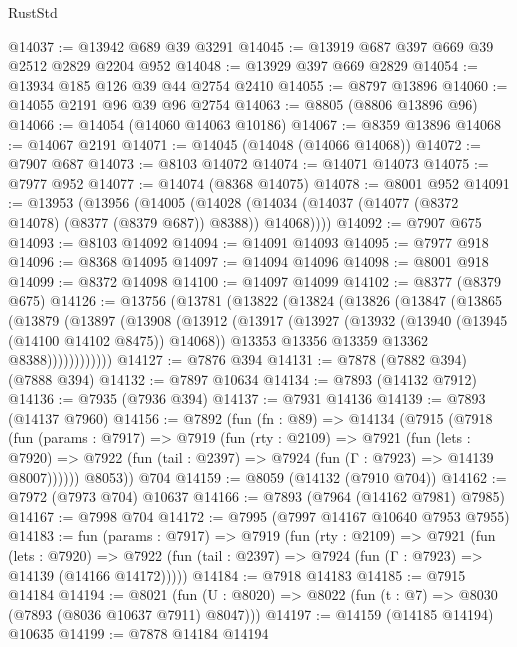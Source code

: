 \begin{lexlean}{RustStd}
\begin{coremodule}
{\begin{coremodule}
{{{{{{{{{{{{{{{{{{{{{{{{{{{{{{{{{{{{{{{{{{{{{{{{{{@14037 := @13942 @689 @39 @3291
@14045 := @13919 @687 @397 @669 @39 @2512 @2829 @2204 @952
@14048 := @13929 @397 @669 @2829
@14054 := @13934 @185 @126 @39 @44 @2754 @2410
@14055 := @8797 @13896
@14060 := @14055 @2191 @96 @39 @96 @2754
@14063 := @8805 (@8806 @13896 @96)
@14066 := @14054 (@14060 @14063 @10186)
@14067 := @8359 @13896
@14068 := @14067 @2191
@14071 := @14045 (@14048 (@14066 @14068))
@14072 := @7907 @687
@14073 := @8103 @14072
@14074 := @14071 @14073
@14075 := @7977 @952
@14077 := @14074 (@8368 @14075)
@14078 := @8001 @952
@14091 := @13953
    (@13956
      (@14005 (@14028 (@14034 (@14037 (@14077 (@8372 @14078) (@8377 (@8379 @687)) @8388)) @14068))))
@14092 := @7907 @675
@14093 := @8103 @14092
@14094 := @14091 @14093
@14095 := @7977 @918
@14096 := @8368 @14095
@14097 := @14094 @14096
@14098 := @8001 @918
@14099 := @8372 @14098
@14100 := @14097 @14099
@14102 := @8377 (@8379 @675)
@14126 := @13756
    (@13781
      (@13822
        (@13824
          (@13826
            (@13847
              (@13865
                (@13879
                  (@13897
                    (@13908
                      (@13912
                        (@13917
                          (@13927
                            (@13932 (@13940 (@13945 (@14100 @14102 @8475)) @14068))
                            @13353
                            @13356
                            @13359
                            @13362
                            @8388))))))))))))
@14127 := @7876 @394
@14131 := @7878 (@7882 @394) (@7888 @394)
@14132 := @7897 @10634
@14134 := @7893 (@14132 @7912)
@14136 := @7935 (@7936 @394)
@14137 := @7931 @14136
@14139 := @7893 (@14137 @7960)
@14156 := @7892
    (fun (fn : @89) =>
    @14134
      (@7915
        (@7918
          (fun (params : @7917) =>
          @7919
            (fun (rty : @2109) =>
            @7921
              (fun (lets : @7920) =>
              @7922 (fun (tail : @2397) => @7924 (fun (Γ : @7923) => @14139 @8007))))))
        @8053))
    @704
@14159 := @8059 (@14132 (@7910 @704))
@14162 := @7972 (@7973 @704) @10637
@14166 := @7893 (@7964 (@14162 @7981) @7985)
@14167 := @7998 @704
@14172 := @7995 (@7997 @14167 @10640 @7953 @7955)
@14183 := fun (params : @7917) =>
  @7919
    (fun (rty : @2109) =>
    @7921
      (fun (lets : @7920) =>
      @7922 (fun (tail : @2397) => @7924 (fun (Γ : @7923) => @14139 (@14166 @14172)))))
@14184 := @7918 @14183
@14185 := @7915 @14184
@14194 := @8021
    (fun (U : @8020) => @8022 (fun (t : @7) => @8030 (@7893 (@8036 @10637 @7911) @8047)))
@14197 := @14159 (@14185 @14194) @10635
@14199 := @7878 @14184 @14194
}}}}}}}}}}}}}}}}}}}}}}}}}}}}}}}}}}}}}}}}}}}}}}}}}}
\end{coremodule}}
\end{coremodule}
\end{lexlean}
